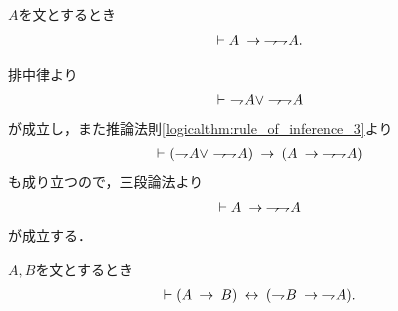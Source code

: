 	\begin{screen}
		\begin{logicalthm}[二重否定の法則の逆が成り立つ]\label{logicalthm:converse_of_law_of_double_negative}
			$A$を文とするとき
			\begin{align}
				\vdash A \rarrow \negation \negation A.
			\end{align}
		\end{logicalthm}
	\end{screen}
	
	\begin{prf}
		排中律より
		\begin{align}
			\vdash\ \negation A \vee \negation \negation A
		\end{align}
		が成立し，また推論法則\ref{logicalthm:rule_of_inference_3}より
		\begin{align}
			\vdash (\negation A \vee \negation \negation A)
			\rarrow (A \rarrow \negation \negation A)
		\end{align}
		も成り立つので，三段論法より
		\begin{align}
			\vdash A \rarrow \negation \negation A
		\end{align}
		が成立する．
		\QED
	\end{prf}
	
	\begin{screen}
		\begin{logicalthm}[対偶命題は同値]\label{thm:contraposition_is_true}
			$A,B$を文とするとき
			\begin{align}
				\vdash (A \rarrow B) \lrarrow (\negation B \rarrow \negation A).
			\end{align}
		\end{logicalthm}
	\end{screen}
	
